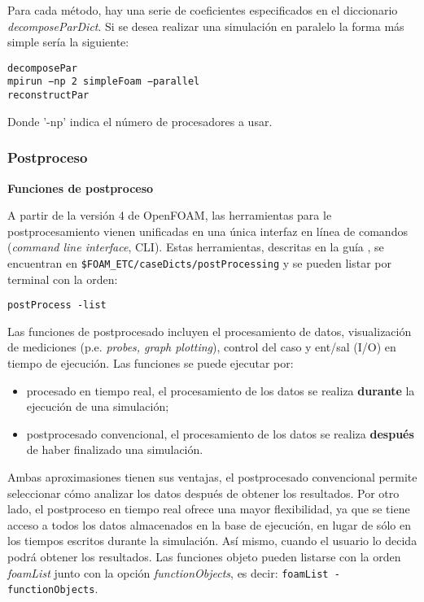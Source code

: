 Para cada método, hay una serie de coeficientes especificados en el
diccionario \emph{decomposeParDict}. Si se desea realizar una simulación
en paralelo la forma más simple sería la siguiente:

\begin{lstlisting}[style=bash]
decomposePar
mpirun −np 2 simpleFoam −parallel
reconstructPar
\end{lstlisting}

Donde '-np' indica el número de procesadores a usar.

\subsubsection{Postproceso}\label{header-n376}

\textbf{Funciones de postproceso}

A partir de la versión 4 de OpenFOAM, las herramientas para le
postprocesamiento vienen unificadas en una única interfaz en línea de
comandos (\emph{command line interface}, CLI). Estas herramientas,
descritas en la guía \cite{cli}, se encuentran en
\lstinline[style=bash]{$FOAM_ETC/caseDicts/postProcessing} y se
pueden listar por terminal con la orden:

\begin{lstlisting}[style=bash]
postProcess -list
\end{lstlisting}

Las funciones de postprocesado incluyen el procesamiento de datos,
visualización de mediciones (p.e. \emph{probes, graph plotting}),
control del caso y ent/sal (I/O) en tiempo de ejecución. Las funciones
se puede ejecutar por:

\begin{itemize}
\item
  procesado en tiempo real, el procesamiento de los datos se realiza
  \textbf{durante} la ejecución de una simulación;
\item
  postprocesado convencional, el procesamiento de los datos se realiza
  \textbf{después} de haber finalizado una simulación.
\end{itemize}

Ambas aproximasiones tienen sus ventajas, el postprocesado convencional
permite seleccionar cómo analizar los datos después de obtener los
resultados. Por otro lado, el postproceso en tiempo real ofrece una
mayor flexibilidad, ya que se tiene acceso a todos los datos almacenados
en la base de ejecución, en lugar de sólo en los tiempos escritos
durante la simulación. Así mismo, cuando el usuario lo decida podrá
obtener los resultados. Las funciones objeto pueden listarse con la
orden \emph{foamList} junto con la opción \emph{functionObjects}, es
decir: \texttt{foamList\ -functionObjects}.

